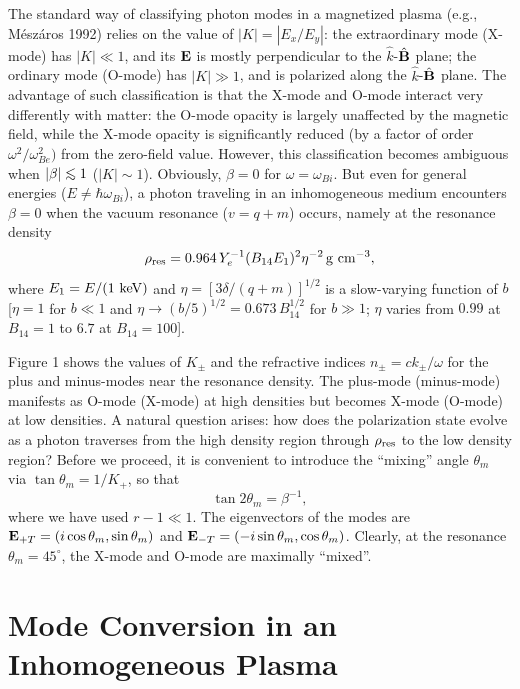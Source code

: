 \documentclass{aastex}
\def\be{\begin{equation}}
\def\ee{\end{equation}}
\def\lo{\mathrel{\raise.3ex\hbox{$<$}\mkern-14mu
             \lower0.6ex\hbox{$\sim$}}}
\def\bE{{\bf E}}
\def\bB{{\bf B}}
\begin{document}
The standard way of classifying photon modes in a magnetized plasma
(e.g., M\'{e}sz\'{a}ros 1992) relies on the value of $|K|=|E_x/E_y|$:
the extraordinary mode (X-mode) has $|K|\ll 1$, and its $\bE$ is mostly
perpendicular to the ${\hat k}$-$\hat\bB$ plane;
the ordinary mode (O-mode) has $|K|\gg 1$, and is polarized
along the ${\hat k}$-$\hat\bB$ plane. The advantage of such classification
is that the X-mode and O-mode interact very differently with matter:
the O-mode opacity is largely unaffected by the magnetic field,
while the X-mode opacity is significantly reduced (by a factor
of order $\omega^2/\omega_{Be}^2)$ from the zero-field value.
However, this classification becomes ambiguous when $|\beta|\lo 1$
($|K|\sim 1$). Obviously, $\beta=0$ for $\omega=\omega_{Bi}$. 
But even for general energies ($E\neq \hbar\omega_{Bi}$), a photon 
traveling in an inhomogeneous medium 
encounters $\beta=0$ when the vacuum resonance ($v=q+m$) occurs,
namely at the resonance density
\be
\rho_{\rm res}=0.964\,Y_e^{-1}(B_{14}E_1)^2\eta^{-2}\,{\rm g~cm}^{-3},
\label{eqrhores}\ee
where $E_1=E/(1~{\rm keV})$ and
$\eta=[3\delta/(q+m)]^{1/2}$ is a slow-varying function of
$b$ [$\eta=1$ for $b\ll 1$ and
$\eta\rightarrow (b/5)^{1/2}=0.673\,B_{14}^{1/2}$
for $b\gg 1$; $\eta$ varies from $0.99$ at $B_{14}=1$ to $6.7$ at
$B_{14}=100$].

Figure 1 shows the values of $K_\pm$ and the refractive indices
$n_\pm=ck_\pm/\omega$ for the plus and minus-modes near the resonance
density.  The plus-mode (minus-mode) manifests as O-mode (X-mode)
at high densities but becomes X-mode (O-mode) at low densities.
A natural question arises: how does the polarization state evolve
as a photon traverses from the high density region through $\rho_{\rm res}$
to the low density region? Before we proceed,
it is convenient to introduce the ``mixing'' angle $\theta_m$ via
$\tan\theta_m=1/K_+$, so that
\be
\tan 2\theta_m=\beta^{-1},
\label{eqthetam}\ee
where we have used $r-1\ll 1$. The eigenvectors of the modes are
$\bE_{+T}=(i\cos\theta_m,\sin\theta_m)$ and
$\bE_{-T}=(-i\sin\theta_m,\cos\theta_m)$.
Clearly, at the resonance $\theta_m=45^\circ$, the X-mode and O-mode are
maximally ``mixed''.


\section{Mode Conversion in an Inhomogeneous Plasma}
\end{document}
